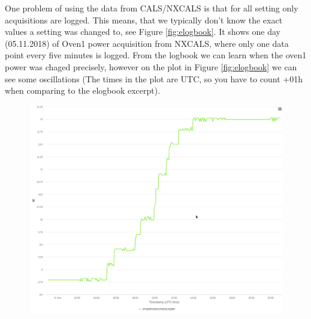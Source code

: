 \documentclass[12pt,a4paper]{article}
\begin{document}
One problem of using the data from CALS/NXCALS is that for all setting only acquisitions are logged. This means, that we typically don't know the exact values a setting was changed to, see Figure \ref{fig:elogbook}. It shows one day (05.11.2018) of Oven1 power acquisition from NXCALS, where only one data point every five minutes is logged. From the logbook we can learn when the oven1 power was chaged precisely, however on the plot in Figure \ref{fig:elogbook} we can see some oscillations (The times in the plot are UTC, so you have to count +01h when comparing to the elogbook excerpt). 


\begin{figure}
\centering
\includegraphics{images/oven1example_05112018.png}

\end{figure}
\end{document}
